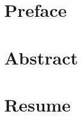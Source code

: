 \documentclass[a4paper]{article}
\begin{document}





\section*{Preface}

\newpage


\section*{Abstract}

\newpage


\section*{Resume}

\newpage


\begin{spacing}{1.22}
	\begin{adjustwidth}{-1cm}{-1cm}
		\setcounter{tocdepth}{4}
		\thispagestyle{plain}
		\renewcommand\contentsname{Table of Contents}
		\tableofcontents
		\newpage
	\end{adjustwidth}
\end{spacing}



% 	

% 	
\end{document}
